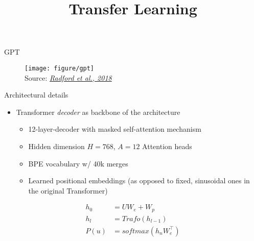 



\newcommand{\titlefigure}{figure/gpt_sq.png}
\newcommand{\learninggoals}{
\item Understand inner workings of BPE
\item Being able to compare BPE to other tokenization approaches}

\title{Transfer Learning}
\date{}




\begin{vbframe}{GPT \href{https://s3-us-west-2.amazonaws.com/openai-assets/research-covers/language-unsupervised/language_understanding_paper.pdf}{}}

\vfill

	\begin{figure}
		\centering
		\texttt{[image: figure/gpt]}\\ 
		\footnotesize{Source:} \href{https://s3-us-west-2.amazonaws.com/openai-assets/research-covers/language-unsupervised/language_understanding_paper.pdf}{\footnotesize \it Radford et al., 2018}
	\end{figure}

\vfill

\end{vbframe}


\begin{vbframe}{Architectural details}

\vfill

	\begin{itemize}
		\item Transformer \textit{decoder} as backbone of the architecture
			\begin{itemize}
				\item 12-layer-decoder with masked self-attention mechanism
				\item Hidden dimension $H = 768$, $A = 12$ Attention heads
				\item BPE vocabulary w/ 40k merges
				\item Learned positional embeddings (as opposed to fixed, sinusoidal ones in the original Transformer)
			\end{itemize}
	\end{itemize}

\begin{align*}
	h_0 &= U W_e + W_p \\
	h_l &= Trafo(h_{l-1}) \\
	P(u) &= softmax(h_n W_e^\top)
\end{align*}

\vfill

\end{vbframe}

